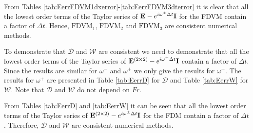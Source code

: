 From Tables \ref{tab:EerrFDVM1dxerror}-\ref{tab:EerrFDVM3dterror} it is clear that all the lowest order terms of the Taylor series of $\mathbf{E}- e^{i\omega^\pm \Delta t } \mathbf{I}$ for the FDVM contain a factor of $\Delta t$. Hence, $\text{FDVM}_1$, $\text{FDVM}_2$ and $\text{FDVM}_3$ are consistent numerical methods.  

To demonstrate that $\mathcal{D}$ and $\mathcal{W}$ are consistent we need to demonstrate that all the lowest order terms of the Taylor series of $\mathbf{E}^{\left(2\times 2\right)}- e^{i\omega^\pm \Delta t } \mathbf{I}$ contain a factor of $\Delta t$. Since the results are similar for $\omega^-$ and $\omega^+$ we only give the results for $\omega^+$. The results for $\omega^+$ are presented in Table \ref{tab:EerrD} for $\mathcal{D}$ and Table \ref{tab:EerrW} for $\mathcal{W}$. Note that $\mathcal{D}$ and $\mathcal{W}$ do not depend on $Fr$.

From Tables \ref{tab:EerrD} and \ref{tab:EerrW} it can be seen that all the lowest order terms of the Taylor series of $\mathbf{E}^{\left(2\times 2\right)}- e^{i\omega^\pm \Delta t } \mathbf{I}$ for the FDM contain a factor of $\Delta t$. Therefore, $\mathcal{D}$ and $\mathcal{W}$ are consistent numerical methods.  

